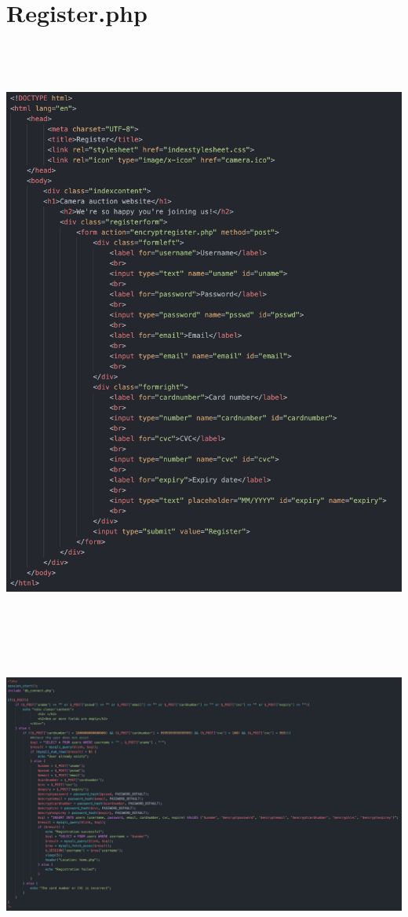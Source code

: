 \section*{Register.php}\includegraphics[width=6.26806in,height=7.90972in]{ch6_appendix/media/image9.png}

\includegraphics[width=6.26806in,height=3.69792in]{ch6_appendix/media/image10.png}

